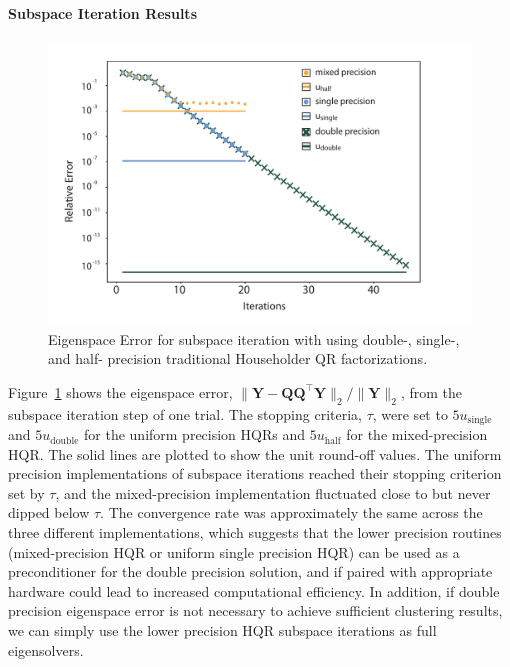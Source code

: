 \documentclass[review,onefignum,onetabnum]{siamart190516}
\newcommand{\bb}[1]{\mathbf{#1}}
\begin{document}
\paragraph{Subspace Iteration Results} 
\begin{figure}
	\centering
	\includegraphics[width=.5\textwidth]{./figures/5000-19subIter.pdf}
	\caption{\label{fig:subIter} Eigenspace Error for subspace iteration with using double-, single-, and half- precision traditional Householder QR factorizations.}
	\vspace{-20pt}	
\end{figure}
Figure~\ref{fig:subIter} shows the eigenspace error, $\|\bb{Y}-\bb{QQ}^{\top}\bb{Y}\|_2/\|\bb{Y}\|_2$, from the subspace iteration step of one trial.
The stopping criteria, $\tau$, were set to $5u_{\text{single}}$ and $5u_{\text{double}}$ for the uniform precision HQRs and $5u_{\text{half}}$ for the mixed-precision HQR.
The solid lines are plotted to show the unit round-off values. 
The uniform precision implementations of subspace iterations reached their stopping criterion set by $\tau$, and the mixed-precision implementation fluctuated close to but never dipped below $\tau$. 
The convergence rate was approximately the same across the three different implementations, which suggests that the lower precision routines (mixed-precision HQR or uniform single precision HQR) can be used as a preconditioner for the double precision solution, and if paired with appropriate hardware could lead to increased computational efficiency.
In addition, if double precision eigenspace error is not necessary to achieve sufficient clustering results, we can simply use the lower precision HQR subspace iterations as full eigensolvers. 
\end{document}
